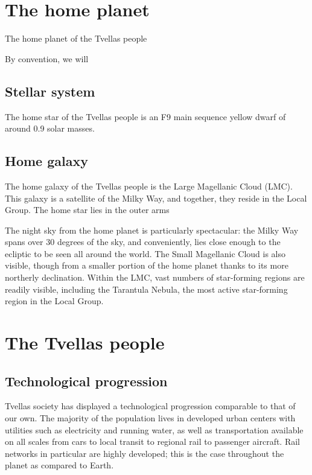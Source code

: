 \chapter{The home planet}

The home planet of the Tvellas people

By convention, we will 

\section{Stellar system}

The home star of the Tvellas people is an F9 main sequence yellow dwarf of around 0.9 solar masses.

\section{Home galaxy}

The home galaxy of the Tvellas people is the Large Magellanic Cloud (LMC). This galaxy is a 
satellite of the Milky Way, and together, they reside in the Local Group. The home star lies in
the outer arms

The night sky from the home planet is particularly spectacular: the Milky Way spans over 30 degrees 
of the sky, and conveniently, lies close enough to the ecliptic to be seen all around the world.
The Small Magellanic Cloud is also visible, though from a smaller portion of the home planet thanks
to its more northerly declination. Within the LMC, vast numbers of star-forming regions are readily
visible, including the Tarantula Nebula, the most active star-forming region in the Local Group.

\chapter{The Tvellas people}

\section{Technological progression}

Tvellas society has displayed a technological progression comparable to that of our own. The
majority of the population lives in developed urban centers with utilities such as electricity and
running water, as well as transportation available on all scales from cars to local transit to
regional rail to passenger aircraft. Rail networks in particular are highly developed; this is the
case throughout the planet as compared to Earth.

